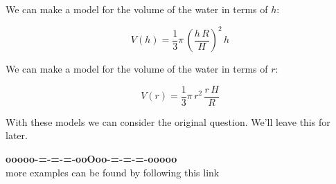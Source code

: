 \documentclass{ximera}
\begin{document}
We can make a model for the volume of the water in terms of $h$:

\[  V(h) = \frac{1}{3}  \pi \, \left( \frac{h \, R}{H} \right)^2 \, h    \]



We can make a model for the volume of the water in terms of $r$:

\[  V(r) = \frac{1}{3}  \pi \, r^2 \, \frac{r \, H}{R}    \]





With these models we can consider the original question.  We'll leave this for later.













\begin{center}
\textbf{\textcolor{green!50!black}{ooooo-=-=-=-ooOoo-=-=-=-ooooo}} \\

more examples can be found by following this link\\ 

\end{center}
\end{document}
